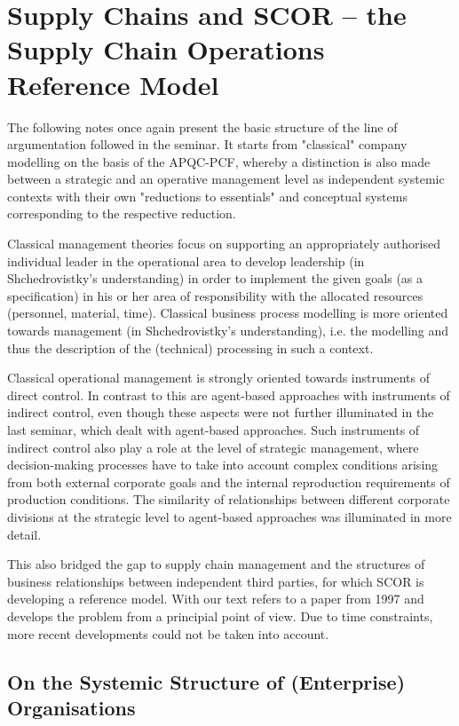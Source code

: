 \documentclass[11pt,a4paper]{article}
\begin{document}
\section{Supply Chains and SCOR -- the Supply Chain Operations Reference
  Model}

The following notes once again present the basic structure of the line of
argumentation followed in the seminar. It starts from "classical" company
modelling on the basis of the APQC-PCF, whereby a distinction is also made
between a strategic and an operative management level as independent systemic
contexts with their own "reductions to essentials" and conceptual systems
corresponding to the respective reduction.

Classical management theories focus on supporting an appropriately authorised
individual leader in the operational area to develop leadership (in
Shchedrovistky's understanding) in order to implement the given goals (as a
specification) in his or her area of responsibility with the allocated
resources (personnel, material, time). Classical business process modelling is
more oriented towards management (in Shchedrovistky's understanding), i.e. the
modelling and thus the description of the (technical) processing in such a
context.

Classical operational management is strongly oriented towards instruments of
direct control. In contrast to this are agent-based approaches with
instruments of indirect control, even though these aspects were not further
illuminated in the last seminar, which dealt with agent-based approaches. Such
instruments of indirect control also play a role at the level of strategic
management, where decision-making processes have to take into account complex
conditions arising from both external corporate goals and the internal
reproduction requirements of production conditions. The similarity of
relationships between different corporate divisions at the strategic level to
agent-based approaches was illuminated in more detail.

This also bridged the gap to supply chain management and the structures of
business relationships between independent third parties, for which SCOR is
developing a reference model. With \cite{Stewart1997} our text refers to a
paper from 1997 and develops the problem from a principial point of view. Due
to time constraints, more recent developments could not be taken into account.

\subsection{On the Systemic Structure of (Enterprise) Organisations}
\end{document}
